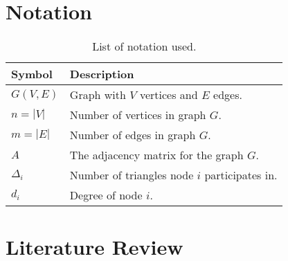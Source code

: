 \documentclass[12pt]{report}
\begin{document}
\chapter{Notation}

\begin{table}[ht]
    \centering
    \begin{tabular}{ll}
        \toprule
        \textbf{Symbol} & \textbf{Description} \\
        \midrule
        $G(V, E)$       & Graph with $V$ vertices and $E$ edges. \\
        $n = |V|$       & Number of vertices in graph $G$. \\
        $m = |E|$       & Number of edges in graph $G$. \\
        $A$             & The adjacency matrix for the graph $G$. \\
        $\Delta_i$      & Number of triangles node $i$ participates in. \\
        $d_i$           & Degree of node $i$. \\
        \bottomrule
    \end{tabular}
    \caption{List of notation used.}
    \label{tab:notation}
\end{table}

\newpage

\chapter{Literature Review}
\end{document}
